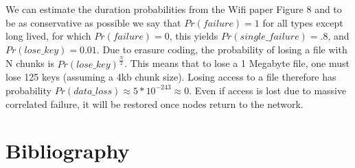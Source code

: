 \documentclass[a4paper,10pt]{article}
\begin{document}
We can estimate the duration probabilities from the Wifi paper Figure 8 
\cite{wifi} and to be as conservative as possible we say that $Pr(failure)=1$ 
for all types except long lived, for which $Pr(failure)=0$, this yields 
$Pr(single\_failure)=.8$, and $Pr(lose\_key)=0.01$.  Due to erasure coding, the 
probability of losing a file with N chunks is $Pr(lose\_key)^{\frac{N}{2}}$.  
This means that to lose a 1 Megabyte file, one must lose 125 keys (assuming a 
4kb chunk size). Losing access to a file therefore has probability 
$Pr(data\_loss) \approx 5*10^{-243} \approx 0$.  Even if access is lost due to 
massive correlated failure, it will be restored once nodes return to the 
network.

\pagebreak
\section{Bibliography}


\end{document}

